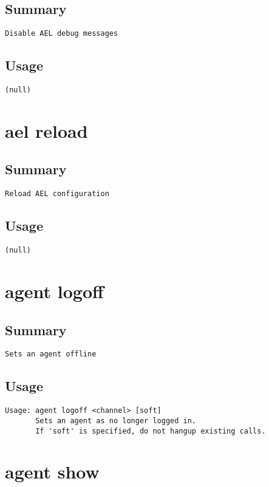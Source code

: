 \subsection{Summary}
\begin{verbatim}
Disable AEL debug messages
\end{verbatim}
\subsection{Usage}
\begin{verbatim}
(null)
\end{verbatim}


\section{ael reload}
\subsection{Summary}
\begin{verbatim}
Reload AEL configuration
\end{verbatim}
\subsection{Usage}
\begin{verbatim}
(null)
\end{verbatim}


\section{agent logoff}
\subsection{Summary}
\begin{verbatim}
Sets an agent offline
\end{verbatim}
\subsection{Usage}
\begin{verbatim}
Usage: agent logoff <channel> [soft]
       Sets an agent as no longer logged in.
       If 'soft' is specified, do not hangup existing calls.

\end{verbatim}


\section{agent show}
